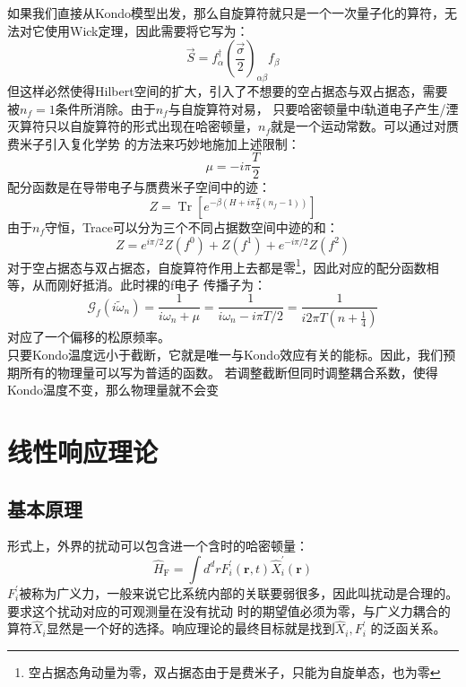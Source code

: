\documentclass[10pt,openany]{book}
\theoremstyle{thmstyle} %
\theoremstyle{defstyle} %
\theoremstyle{prostyle} %
\begin{document}
如果我们直接从Kondo模型出发，那么自旋算符就只是一个一次量子化的算符，无法对它使用Wick定理，因此需要将它写为：
\begin{equation}
  \vec{S}=f_\alpha^{\dagger}\left(\frac{\vec{\sigma}}{2}\right)_{\alpha \beta} f_\beta
\end{equation}
但这样必然使得Hilbert空间的扩大，引入了不想要的空占据态与双占据态，需要被$ n_f=1 $条件所消除。由于$ n_f $与自旋算符对易，
只要哈密顿量中f轨道电子产生/湮灭算符只以自旋算符的形式出现在哈密顿量，$ n_f $就是一个运动常数。可以通过对赝费米子引入复化学势
的方法来巧妙地施加上述限制：
\begin{equation}
  \mu=-i \pi \frac{T}{2}
\end{equation}  
配分函数是在导带电子与赝费米子空间中的迹：
\begin{equation}
  Z=\operatorname{Tr}\left[e^{-\beta\left(H+i \pi \frac{T}{2}\left(n_f-1\right)\right)}\right]
\end{equation}
由于$ n_f $守恒，Trace可以分为三个不同占据数空间中迹的和：
\begin{equation}
  Z=e^{i \pi / 2} Z\left(f^0\right)+Z\left(f^1\right)+e^{-i \pi / 2} Z\left(f^2\right)
\end{equation} 
对于空占据态与双占据态，自旋算符作用上去都是零\footnote{空占据态角动量为零，双占据态由于是费米子，只能为自旋单态，也为零}，因此对应的配分函数相等，从而刚好抵消。此时裸的f电子
传播子为：
\begin{equation}
  \mathcal{G}_f\left(i \tilde{\omega}_n\right)=\frac{1}{i \omega_n+\mu}=\frac{1}{i \omega_n-i \pi T / 2}=\frac{1}{i 2 \pi T\left(n+\frac{1}{4}\right)}
\end{equation}
对应了一个偏移的松原频率。\\

只要Kondo温度远小于截断，它就是唯一与Kondo效应有关的能标。因此，我们预期所有的物理量可以写为普适的函数。
若调整截断但同时调整耦合系数，使得Kondo温度不变，那么物理量就不会变
\section{线性响应理论}
\subsection{基本原理}
形式上，外界的扰动可以包含进一个含时的哈密顿量：
\begin{equation}
  \hat{H}_{\mathrm{F}}=\int d^d r F_i^{\prime}(\mathbf{r}, t) \hat{X}_i^{\prime}(\mathbf{r})
\end{equation}
$ F_i^{\prime} $被称为广义力，一般来说它比系统内部的关联要弱很多，因此叫扰动是合理的。要求这个扰动对应的可观测量在没有扰动
时的期望值必须为零，与广义力耦合的算符$ \hat{X}_i $显然是一个好的选择。响应理论的最终目标就是找到$ \hat{X}_i,F_i^{\prime} $
的泛函关系。\\
\end{document}
